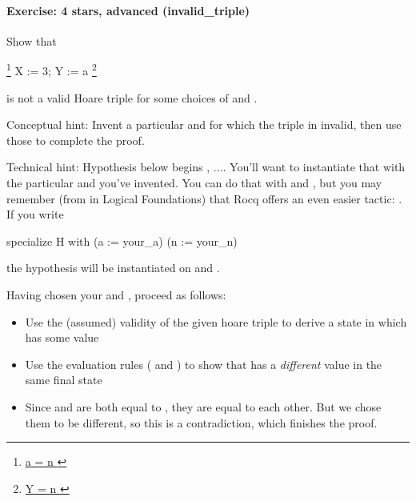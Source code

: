 \documentclass[12pt]{report}
\begin{document}
\paragraph{Exercise: 4 stars, advanced (invalid\_triple)}




    Show that


    \footnote{\url{ a = n }} X := 3; Y := a \footnote{\url{ Y = n }}


    is not a valid Hoare triple for some choices of  and .


    Conceptual hint: Invent a particular  and  for which the
    triple in invalid, then use those to complete the proof.


    Technical hint: Hypothesis  below begins \coqdockw{\ensuremath{\forall}}  , ....
    You'll want to instantiate that with the particular  and 
    you've invented.  You can do that with  and , but
    you may remember (from  in Logical Foundations)
    that Rocq offers an even easier tactic: .  If you write


       specialize H with (a := your\_a) (n := your\_n)


    the hypothesis will be instantiated on  and .


    Having chosen your  and , proceed as follows:

\begin{itemize}
\item  Use the (assumed) validity of the given hoare triple to derive
       a state  in which  has some value 

\item  Use the evaluation rules ( and ) to show that
        has a \textit{different} value  in the same final state 

\item  Since  and  are both equal to  , they are equal
       to each other. But we chose them to be different, so this is a
       contradiction, which finishes the proof.

\end{itemize}
 
\end{document}
